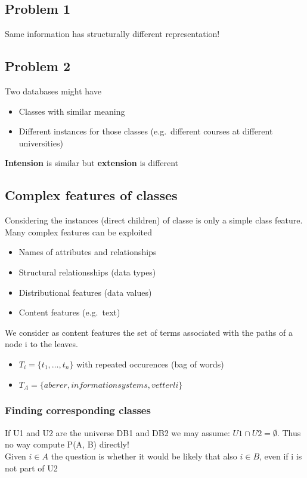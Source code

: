 \subsection{Problem 1}
Same information has structurally different representation!

\subsection{Problem 2}
Two databases might have
\begin{itemize}
\item Classes with similar meaning
\item Different instances for those classes (e.g.\ different courses
  at different universities)
\end{itemize}

\textbf{Intension} is similar but \textbf{extension} is different

\subsection{Complex features of classes}
Considering the instances (direct children) of classe is only a simple
class feature. \\
Many complex features can be exploited
\begin{itemize}
\item Names of attributes and relationships
\item Structural relationsships (data types)
\item Distributional features (data values)
\item Content features (e.g.\, text)
\end{itemize}

We consider as content features the set of terms associated with the
paths of a node i to the leaves.
\begin{itemize}
\item $ T_i = \{t_1, \ldots, t_n \}$ with repeated occurences (bag of
  words)
\item $ T_A = \{aberer, information systems, vetterli \}$
\end{itemize}

\subsubsection{Finding corresponding classes}
If U1 and U2 are the universe DB1 and DB2 we may assume: $ U1 \cap U2
= \emptyset $. Thus no way compute P(A, B) directly! \\
Given $ i \in A $ the question is whether it would be likely that also
$ i \in B$, even if i is not part of U2

